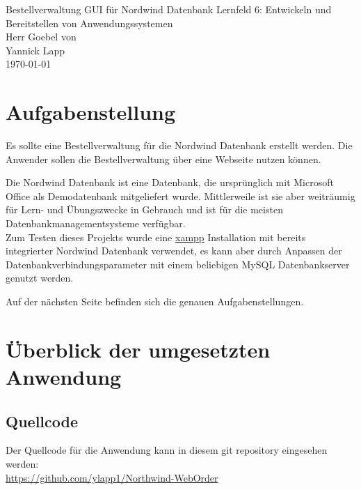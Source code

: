 \documentclass[12pt,pdftex,parskip=half]{scrartcl}
\begin{document}
\begin{titlepage}
    \begin{center}
        \vfill {{\Large Bestellverwaltung GUI für Nordwind Datenbank}}
        \vfill {Lernfeld 6: Entwickeln und Bereitstellen von Anwendungssystemen\\Herr Goebel}
        \vfill {von\\Yannick Lapp\\\today} %
    \end{center}
\end{titlepage}


\tableofcontents
\clearpage


\section{Aufgabenstellung}

Es sollte eine Bestellverwaltung für die Nordwind Datenbank erstellt werden.
Die Anwender sollen die Bestellverwaltung über eine Webseite nutzen können.

Die Nordwind Datenbank ist eine Datenbank, die ursprünglich mit Microsoft Office als Demodatenbank mitgeliefert wurde. Mittlerweile ist sie aber weiträumig für Lern- und Übungszwecke in Gebrauch und ist für die meisten Datenbankmanagementsysteme verfügbar.\\
Zum Testen dieses Projekts wurde eine
\href{https://www.apachefriends.org/de/index.html}{xampp}
Installation mit bereits integrierter Nordwind Datenbank verwendet, es kann aber durch Anpassen der Datenbankverbindungsparameter mit einem beliebigen MySQL Datenbankserver genutzt werden.

Auf der nächsten Seite befinden sich die genauen Aufgabenstellungen.




\section{Überblick der umgesetzten Anwendung}


    \subsection{Quellcode}

    Der Quellcode für die Anwendung kann in diesem git repository eingesehen werden:\\
    \href{https://github.com/ylapp1/Northwind-WebOrder}{https://github.com/ylapp1/Northwind-WebOrder}
\end{document}
